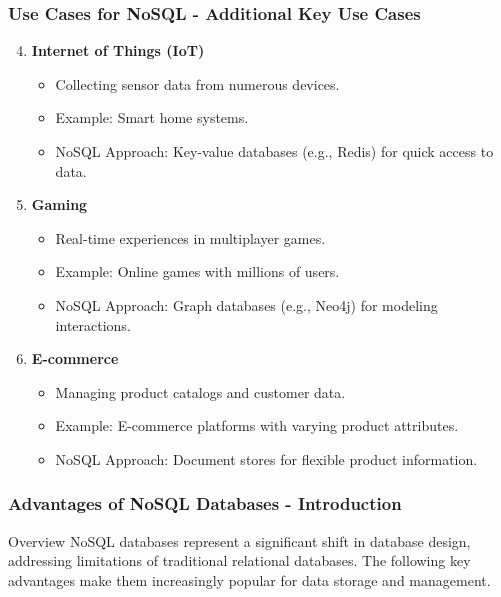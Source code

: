\documentclass[aspectratio=169]{beamer}
\begin{document}
\begin{frame}[fragile]
    \frametitle{Use Cases for NoSQL - Additional Key Use Cases}
    \begin{enumerate}
        \setcounter{enumi}{3} %
        \item \textbf{Internet of Things (IoT)}
          \begin{itemize}
              \item Collecting sensor data from numerous devices.
              \item Example: Smart home systems.
              \item NoSQL Approach: Key-value databases (e.g., Redis) for quick access to data.
          \end{itemize}

        \item \textbf{Gaming}
          \begin{itemize}
              \item Real-time experiences in multiplayer games.
              \item Example: Online games with millions of users.
              \item NoSQL Approach: Graph databases (e.g., Neo4j) for modeling interactions.
          \end{itemize}

        \item \textbf{E-commerce}
          \begin{itemize}
              \item Managing product catalogs and customer data.
              \item Example: E-commerce platforms with varying product attributes.
              \item NoSQL Approach: Document stores for flexible product information.
          \end{itemize}
    \end{enumerate}
\end{frame}

\begin{frame}[fragile]
    \frametitle{Advantages of NoSQL Databases - Introduction}
    \begin{block}{Overview}
        NoSQL databases represent a significant shift in database design, addressing limitations of traditional relational databases. 
        The following key advantages make them increasingly popular for data storage and management.
    \end{block}
\end{frame}
\end{document}
